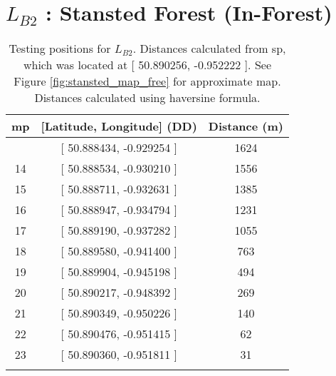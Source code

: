 \section{$L_{B2}$ : Stansted Forest (In-Forest)}\label{sec:stansted_forest_test_pos}

\begin{table}[H]
\centering
\caption[Testing positions for $L_{B2}$]{Testing positions for $L_{B2}$. Distances calculated from \ac{sp}, which was located at [ 50.890256, -0.952222 ]. See Figure \ref{fig:stansted_map_free} for approximate map. Distances calculated using haversine formula.}
\begin{tabular}{ccc}
    \toprule
\textbf{\ac{mp}} & \textbf{[Latitude, Longitude]} (DD) & \textbf{Distance} (m)\\
    \midrule\addlinespace
13 & [ 50.888434, -0.929254 ] & 1624 \\
14 & [ 50.888534, -0.930210 ] & 1556 \\
15 & [ 50.888711, -0.932631 ] & 1385 \\
16 & [ 50.888947, -0.934794 ] & 1231 \\
17 & [ 50.889190, -0.937282 ] & 1055 \\
18 & [ 50.889580, -0.941400 ] & 763 \\
19 & [ 50.889904, -0.945198 ] & 494 \\
20 & [ 50.890217, -0.948392 ] & 269 \\
21 & [ 50.890349, -0.950226 ] & 140 \\
22 & [ 50.890476, -0.951415 ] & 62 \\
23 & [ 50.890360, -0.951811 ] & 31 \\
    \addlinespace\bottomrule
\end{tabular}
\end{table}

